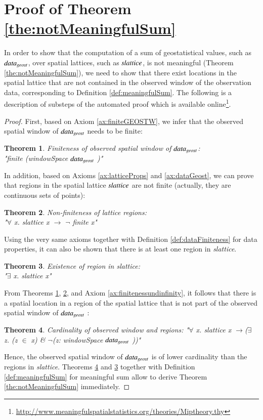 \documentclass[final,authoryear,1p,times]{elsarticle}
\newtheorem{theorem}{Theorem}
\begin{document}
\section{Proof of Theorem \ref{the:notMeaningfulSum}}
\label{appendix:notMeaningfulSum}

In order to show that the computation of a sum of geostatistical values, such as ${\it data_{geost}}$, over spatial lattices, such as ${\it slattice}$, is not meaningful (Theorem \ref{the:notMeaningfulSum}), we need to show that there exist locations in the spatial lattice that are not contained in the observed window of the observation data, corresponding to Definition \ref{def:meaningfulSum}. The following is a description of substeps of the automated proof which is available online\footnote{\url{http://www.meaningfulspatialstatistics.org/theories/Miptheory.thy}}.

\begin{proof}
First, based on Axiom \ref{ax:finiteGEOSTW}, we infer that the observed spatial window of ${\it data_{geost}}$ needs to be finite:
\begin{theorem}
\label{the:finitSwGeost}
Finiteness of observed spatial window of ${\it data_{geost}}$: \\"finite (windowSpace ${\it data_{geost}}$ )"
\end{theorem}

In addition, based on Axioms \ref{ax:latticeProps} and \ref{ax:dataGeost}, we can prove that regions in the spatial lattice ${\it slattice}$ are not finite (actually, they are continuous sets of points):  
\begin{theorem}
\label{the:infinitLatReg}
Non-finiteness of lattice regions: \\"$\forall$ x. slattice x $\rightarrow$ $\neg$ finite x"
\end{theorem}

Using the very same axioms together with Definition \ref{def:dataFiniteness} for data properties, it can also be shown that there is at least one region in \textit{slattice}.
\begin{theorem}
\label{the:exLatReg}
Existence of region in slattice: \\"$\exists$ x. slattice x"
\end{theorem}

From Theorems \ref{the:finitSwGeost}, \ref{the:infinitLatReg}, and Axiom \ref{ax:finitenessundinfinity}, it follows that there is a spatial location in a region of the spatial lattice that is not part of the observed spatial window of ${\it data_{geost}}$ : 
\begin{theorem}
\label{the:cardinality}
Cardinality of observed window and regions: "$\forall$ x. slattice x  $\rightarrow$($\exists$ z. (z $\in$ x) \& $\neg$(z: windowSpace ${\it data_{geost}}$ ))"
\end{theorem}

Hence, the observed spatial window of ${\it data_{geost}}$ is of lower cardinality than the regions in \textit{slattice}. Theorems \ref{the:cardinality} and \ref{the:exLatReg} together with Definition \ref{def:meaningfulSum} for meaningful sum allow to derive Theorem \ref{the:notMeaningfulSum} immediately.
\end{proof}
\end{document}
